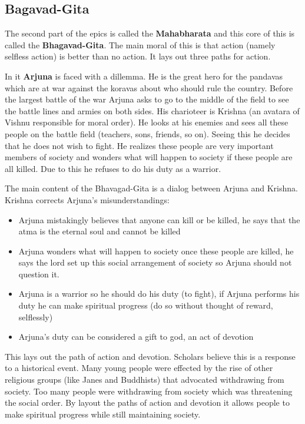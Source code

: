 \documentclass{article}
\begin{document}
\subsection*{Bagavad-Gita}
\label{sec:bagavad_gita}
The second part of the epics is called the \textbf{Mahabharata} and this core of this is called the \textbf{Bhagavad-Gita}. The main moral of this is that action (namely selfless action) is better than no action. It lays out three paths for action.

In it \textbf{Arjuna} is faced with a dillemma. He is the great hero for the pandavas which are at war against the koravas about who should rule the country. Before the largest battle of the war Arjuna asks to go to the middle of the field to see the battle lines and armies on both sides. His charioteer is Krishna (an avatara of Vishnu responsible for moral order). He looks at his enemies and sees all these people on the battle field (teachers, sons, friends, so on). Seeing this he decides that he does not wish to fight. He realizes these people are very important members of society and wonders what will happen to society if these people are all killed.  Due to this he refuses to do his duty as a warrior.

The main content of the Bhavagad-Gita is a dialog between Arjuna and Krishna. Krishna corrects Arjuna's misunderstandings:
\begin{itemize}
	\item Arjuna mistakingly believes that anyone can kill or be killed, he says that the atma is the eternal soul and cannot be killed
	\item Arjuna wonders what will happen to society once these people are killed, he says the lord set up this social arrangement of society so Arjuna should not question it.
	\item Arjuna is a warrior so he should do his duty (to fight), if Arjuna performs his duty he can make spiritual progress (do so without thought of reward, selflessly)
	\item Arjuna's duty can be considered a gift to god, an act of devotion
\end{itemize}

This lays out the path of action and devotion. Scholars believe this is a response to a historical event. Many young people were effected by the rise of other religious groups (like Janes and Buddhists) that advocated withdrawing from society. Too many people were withdrawing from society which was threatening the social order. By layout the paths of action and devotion it allows people to make spiritual progress while still maintaining society.
\end{document}
